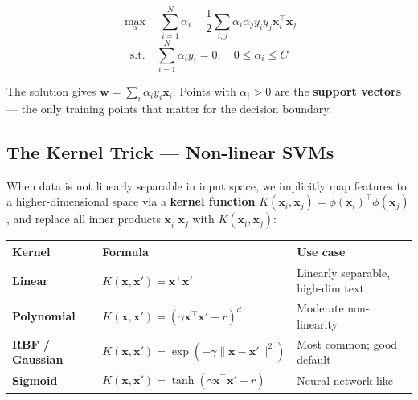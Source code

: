 \documentclass[12pt,a4paper]{article}
\newcommand{\x}{\mathbf{x}}
\newcommand{\w}{\mathbf{w}}
\begin{document}
\[
  \max_{\alpha}\quad \sum_{i=1}^N \alpha_i - \frac{1}{2}\sum_{i,j}\alpha_i\alpha_j y_i y_j \x_i^\top\x_j
\]
\[
  \text{s.t.}\quad \sum_{i=1}^N\alpha_i y_i = 0,\quad 0 \leq \alpha_i \leq C
\]

The solution gives $\w = \sum_i \alpha_i y_i \x_i$. Points with $\alpha_i > 0$ are the \textbf{support vectors} — the only training points that matter for the decision boundary.

\subsection{The Kernel Trick — Non-linear SVMs}

When data is not linearly separable in input space, we implicitly map features to a higher-dimensional space via a \textbf{kernel function} $K(\x_i, \x_j) = \phi(\x_i)^\top\phi(\x_j)$, and replace all inner products $\x_i^\top\x_j$ with $K(\x_i, \x_j)$:

\begin{center}
\begin{tabular}{>{\bfseries}l l l}
\toprule
\textbf{Kernel} & \textbf{Formula} & \textbf{Use case} \\
\midrule
Linear  & $K(\x,\x') = \x^\top\x'$ & Linearly separable, high-dim text \\
Polynomial & $K(\x,\x') = (\gamma\x^\top\x' + r)^d$ & Moderate non-linearity \\
RBF / Gaussian & $K(\x,\x') = \exp(-\gamma\|\x-\x'\|^2)$ & Most common; good default \\
Sigmoid & $K(\x,\x') = \tanh(\gamma\x^\top\x' + r)$ & Neural-network-like \\
\bottomrule
\end{tabular}
\end{center}
\end{document}
